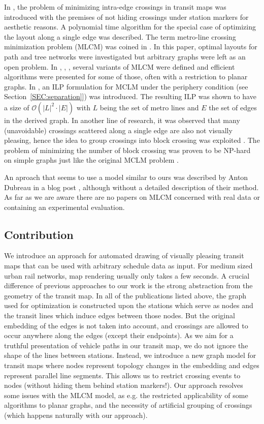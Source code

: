 \documentclass{llncs}
\begin{document}
In \cite{ben06}, the problem of minimizing intra-edge crossings in transit maps was introduced with the premises of not hiding crossings under station markers for aesthetic reasons. A polynomial time algorithm for the special case of optimizing the layout along a single edge was described. The term metro-line crossing minimization problem (MLCM) was coined in \cite{bek07}. In this paper, optimal layouts for path and tree networks were investigated but arbitrary graphs were left as an open problem. In \cite{arg08}, \cite{nol09}, \cite{arg10}, several variants of MLCM were defined and efficient algorithms were presented for some of those, often with a restriction to planar graphs. In \cite{asq08}, an ILP formulation for MCLM under the periphery condition (see Section~\ref{SEC:separation}]) was introduced. The resulting ILP was shown to have a size of $\mathcal{O}(|L|^2 \cdot |E|)$ with $L$ being the set of metro lines and $E$ the set of edges in the derived graph. In another line of research, it was observed that many (unavoidable) crossings scattered along a single edge are also not visually pleasing, hence the idea to group crossings into block crossing was exploited \cite{fin13b}. The problem of minimizing the number of block crossing was proven to be NP-hard on simple graphs just like the original MCLM problem \cite{fin13a}. 

An aproach that seems to use a model similar to ours was described by Anton Dubreau in a blog post \cite{dub16}, although without a detailed description of their method. As far as we are aware there are no papers on MLCM concerned with real data or containing an experimental evaluation.

%
\subsection{Contribution}\label{SEC:contrib}
%

We introduce an approach for automated drawing of visually pleasing transit maps that can be used with arbitrary schedule data as input. For medium sized urban rail networks, map rendering usually only takes a few seconds. A crucial difference of previous approaches to our work is the strong abstraction from the geometry of the transit map. In all of the publications listed above, the graph used for optimization is constructed upon the stations which serve as nodes and the transit lines which induce edges between those nodes. But the original embedding of the edges is not taken into account, and crossings are allowed to occur anywhere along the edges (except their endpoints). As we aim for a truthful presentation of vehicle paths in our transit map, we do not ignore the shape of the lines between stations. Instead, we introduce a new graph model for transit maps where nodes represent topology changes in the embedding and edges represent parallel line segments. This allows us to restrict crossing events to nodes (without hiding them behind station markers!). Our approach resolves some issues with the MLCM model, as e.g. the restricted applicability of some algorithms to planar graphs, and the necessity of artificial grouping of crossings (which happens naturally with our approach).
\end{document}
